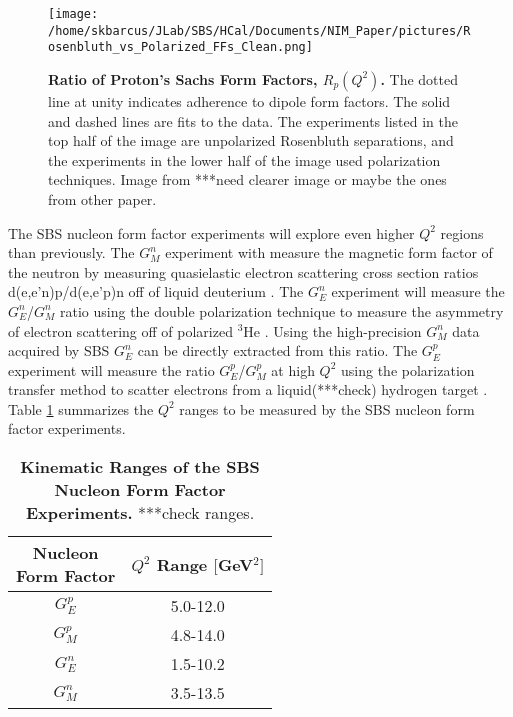 \documentclass[review]{elsarticle}
\newcommand{\q}{$Q^2$ }
\begin{document}
	\begin{figure}[!ht]
	\begin{center}
	\texttt{[image: /home/skbarcus/JLab/SBS/HCal/Documents/NIM\_Paper/pictures/Rosenbluth\_vs\_Polarized\_FFs\_Clean.png]}
	\end{center}
	\caption{
	{\bf{Ratio of Proton's Sachs Form Factors, $R_p(Q^2)$.}} The dotted line at unity indicates adherence to dipole form factors. The solid and dashed lines are fits to the data. The experiments listed in the top half of the image are unpolarized Rosenbluth separations, and the experiments in the lower half of the image used polarization techniques. Image from \cite{cisbani_2014}***need clearer image or maybe the ones from other paper.}
	\label{fig:polarization_vs_rosenbluth}
	\end{figure}	

The SBS nucleon form factor experiments will explore even higher \q regions than previously. The $G_M^n$ experiment with measure the magnetic form factor of the neutron by measuring quasielastic electron scattering cross section ratios d(e,e'n)p/d(e,e'p)n off of liquid deuterium \cite{gmn_proposal}. The $G_E^n$ experiment will measure the $G_E^n$/$G_M^n$ ratio using the double polarization technique to measure the asymmetry of electron scattering off of polarized $^3$He \cite{gen_proposal}. Using the high-precision $G_M^n$ data acquired by SBS $G_E^n$ can be directly extracted from this ratio. The $G_E^p$ experiment will measure the ratio $G_E^p$/$G_M^p$ at high $Q^2$ using the polarization transfer method to scatter electrons from a liquid(***check) hydrogen target \cite{gep_proposal}. Table \ref{tab:q2_ranges} summarizes the \q ranges to be measured by the SBS nucleon form factor experiments. 

 	\begin{table}[h]
	\centering
	\begin{tabular}{|cc|}
	\hline
	\makecell{Nucleon\\ Form Factor} & \makecell{\q Range\\ $[$GeV$^2]$}\\
	\hline
	$G_E^p$ & 5.0-12.0\\
    $G_M^p$ & 4.8-14.0\\
    $G_E^n$ & 1.5-10.2\\
    $G_M^n$ & 3.5-13.5\\
	\hline
	\end{tabular}
	\caption{{\bf{Kinematic Ranges of the SBS Nucleon Form Factor Experiments.}} ***check ranges.} %
	\label{tab:q2_ranges}
	\end{table}
	
\end{document}
